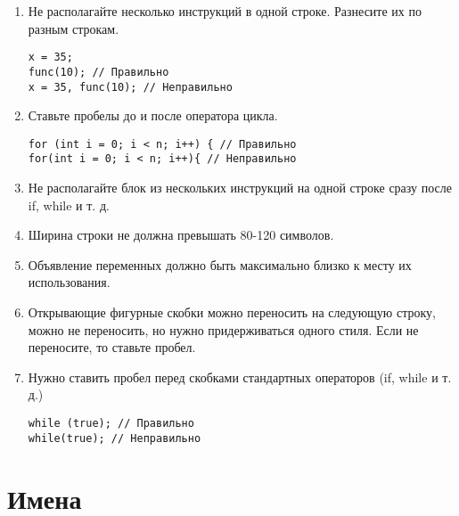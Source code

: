 \documentclass[10pt]{article}
\begin{document}
\begin{enumerate}
\item Не располагайте несколько инструкций в одной строке. Разнесите их по разным строкам.

\begin{lstlisting}
x = 35;
func(10); // Правильно
x = 35, func(10); // Неправильно
\end{lstlisting}

\item Ставьте пробелы до и после оператора цикла.
\begin{lstlisting}
for (int i = 0; i < n; i++) { // Правильно
for(int i = 0; i < n; i++){ // Неправильно
\end{lstlisting}

\item Не располагайте блок из нескольких инструкций на одной строке сразу после if, while и т. д.

\item Ширина строки не должна превышать 80-120 символов.

\item Объявление переменных должно быть максимально близко к месту их использования.

\item Открывающие фигурные скобки можно переносить на следующую строку, можно не переносить, но нужно придерживаться одного стиля. Если не переносите, то ставьте пробел.

\item Нужно ставить пробел перед скобками стандартных операторов (if, while и т. д.)

\begin{lstlisting}
while (true); // Правильно
while(true); // Неправильно
\end{lstlisting}

\end{enumerate}

\section{Имена}
\end{document}

